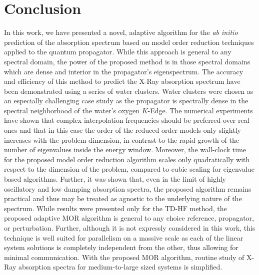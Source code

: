 \section{Conclusion}
\label{sec:MORconclusion}
In this work, we have presented a novel, adaptive algorithm for the \emph{ab
initio} prediction of the absorption spectrum based on model order reduction
techniques applied to the quantum propagator. While this approach is general to
any spectral domain, the power of the proposed method is in those spectral
domains which are dense and interior in the propagator's eigenspectrum. The
accuracy and efficiency of this method to predict the X-Ray absorption spectrum
have been demonstrated using a series of water clusters. Water clusters were
chosen as an especially challenging case study as the propagator is spectrally
dense in the spectral neighborhood of the water's oxygen $K$-Edge. The
numerical experiments have shown that complex interpolation frequencies should
be preferred over real ones and that in this case the order of the reduced
order models only slightly increases with the problem dimension, in contrast to
the rapid growth of the number of eigenvalues inside the energy window.
Moreover, the wall-clock time for the proposed model order reduction algorithm scales
only quadratically with respect to the dimension of the problem,
compared to cubic scaling for eigenvalue based algorithms.
Further, it was shown that, even in the limit of highly oscillatory and low
damping absorption spectra, the proposed algorithm remains practical and thus
may be treated as agnostic to the underlying nature of the spectrum.
While results were presented only
for the TD-HF method, the proposed adaptive MOR algorithm is general to any
choice reference, propagator, or perturbation. Further, although it is not
expressly considered in this work, this technique is well suited for
parallelism on a massive scale as each of the linear system solutions is
completely independent from the other, thus allowing for minimal communication.
With the proposed MOR algorithm, routine study of X-Ray absorption spectra for
medium-to-large sized systems is simplified.
